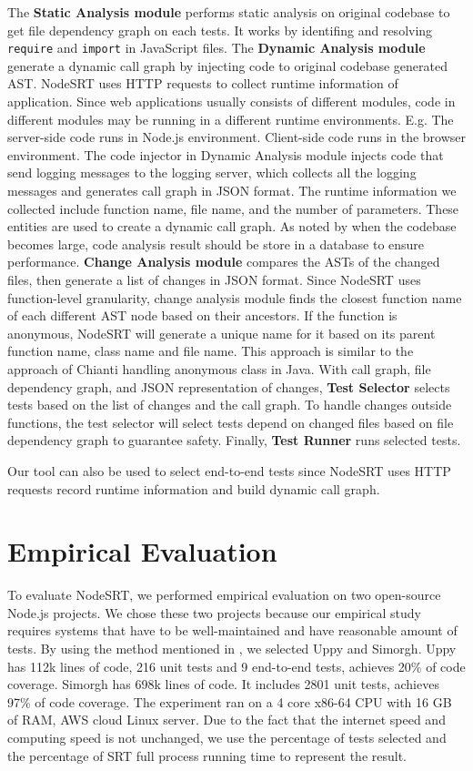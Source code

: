 \documentclass[10pt, conference]{IEEEtran}
\begin{document}
 The \textbf{Static Analysis module} performs static analysis on original codebase to get file dependency
graph on each tests. It works by identifing and resolving \verb|require| and \verb|import| in JavaScript files. 
The \textbf{Dynamic Analysis module} generate a dynamic call graph by injecting code to original codebase 
generated AST. 
NodeSRT uses HTTP requests to collect runtime information of application. Since web applications usually consists of different modules, code in 
different modules may be running in a different runtime environments. E.g. The server-side code runs in Node.js 
environment. Client-side code runs in the browser environment. The code injector in Dynamic Analysis module injects code that send logging messages to 
the logging server, which collects all the logging messages and generates call graph in JSON format. The runtime information we collected include function name, file name, and the number of parameters. 
These entities are used to create a dynamic call graph. As noted by \cite{b2, b4} when the codebase becomes large, code analysis result should be store in a database to ensure performance. 
\textbf{Change Analysis module} compares the ASTs of the changed files, then generate a list of changes in JSON format. Since NodeSRT uses function-level 
granularity, change analysis module finds the closest function name of each different AST node based on their ancestors. 
If the function is anonymous, NodeSRT will generate a unique name for it based on its parent function name, class name and file name. 
This approach is similar to the approach of Chianti \cite{b12} handling anonymous class in Java. With call graph, file dependency graph, 
and JSON representation of changes, \textbf{Test Selector} selects tests based on the list of changes and the call graph. To handle changes outside 
functions, the test selector will select tests depend on changed files based on file dependency graph to guarantee safety. 
Finally, \textbf{Test Runner} runs selected tests.

Our tool can also be used to select end-to-end tests since NodeSRT uses HTTP requests 
record runtime information and build dynamic call graph.

\section{Empirical Evaluation}

To evaluate NodeSRT, we performed empirical evaluation on two open-source Node.js projects. We chose these two projects because 
our empirical study requires systems that have to be well-maintained and have reasonable amount of tests. By using the method mentioned in \cite{b10}, 
we selected Uppy and Simorgh. Uppy has 112k lines of code, 216 unit tests and 9 end-to-end tests, 
achieves 20\% of code coverage. Simorgh has 698k lines of code. 
It includes 2801 unit tests, achieves 97\% of code coverage. The 
experiment ran on a 4 core x86-64 CPU with 16 GB of RAM, AWS cloud Linux server. Due to the fact that the internet speed and computing speed is not 
unchanged, we use the percentage of tests selected and the percentage of SRT full process running time to 
represent the result. 
\end{document}
